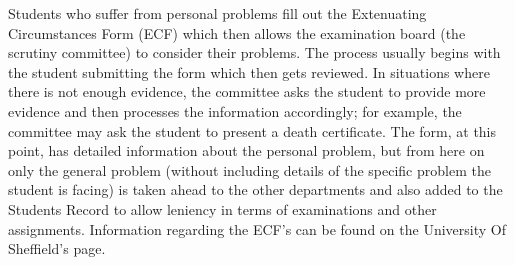 \documentclass[../main.tex]{subfiles}
\begin{document}
\raggedright

Students who suffer from personal problems fill out the Extenuating Circumstances Form (ECF) which then allows the examination board (the
scrutiny committee) to consider their problems. The process usually begins
with the student submitting the form which then gets reviewed. In situations where
there is not enough evidence, the committee asks the student to provide more
evidence and then processes the information accordingly; for example, the committee may ask the student to present a death certificate. The form, at this point, has detailed information about the personal problem, but from here on only the general problem (without including details of the specific problem the student is facing) is taken ahead to the other departments and also added to the Students Record to allow leniency in terms of examinations and other assignments. Information regarding the ECF's can be found on the University
Of Sheffield's page.\cite{ecfuni}
\end{document}
